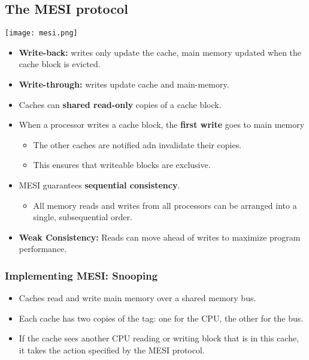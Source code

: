 \documentclass[../main.tex]{subfiles}
\begin{document}
\subsection{The MESI protocol}

\begin{center}
	\texttt{[image: mesi.png]}
\end{center}

\begin{itemize}
	\item \textbf{Write-back:} writes only update the cache, main memory updated when the cache block is evicted.
	\item \textbf{Write-through:} writes update cache and main-memory.
\end{itemize}

\begin{itemize}
	\item Caches can \textbf{shared read-only} copies of a cache block.
	\item When a processor writes a cache block, the \textbf{first write} goes to main memory
	      \begin{itemize}
		      \item The other caches are notified adn invalidate their copies.
		      \item This ensures that writeable blocks are exclusive.
	      \end{itemize}
	\item MESI guarantees \textbf{sequential consistency}.
	      \begin{itemize}
		      \item All memory reads and writes from all processors can be arranged into a single, subsequential order.
	      \end{itemize}
	\item \textbf{Weak Consistency:} Reads can move ahead of writes to maximize program performance.
\end{itemize}

\subsubsection{Implementing MESI: Snooping}

\begin{itemize}
	\item Caches read and write main memory over a shared memory bus.
	\item Each cache has two copies of the tag: one for the CPU, the other for the bus.
	\item If the cache sees another CPU reading or writing block that is in this cache, it takes the action specified by the MESI protocol.
\end{itemize}
\end{document}
